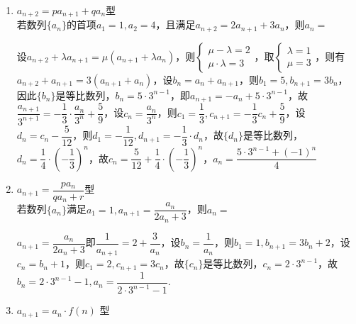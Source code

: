 \begin{enumerate}
\begin{enumerate}
        \begin{jieda}
            $a_{n+1} = 2a_n + 4 \cdot 3^{n+1}$即$\dfrac{a_{n+1}}{3^{n+1}} = \dfrac{2}{3} \cdot \dfrac{a_n}{3^n} + 4$，设$b_n = \dfrac{a_n}{3^n}$，则$b_1 = \dfrac{1}{3}, b_{n+1} = \dfrac{2}{3}b_n + 4$，设$c_n = b_n - 12$，则$c_1 = -\dfrac{35}{3}, c_{n+1} = \dfrac{2}{3}c_n$，因此$\{c_n\}$是等比数列，$c_n = -\dfrac{35}{2} \cdot \left ( \dfrac{2}{3} \right )^n$，故$b_n = 12 - \dfrac{35}{2}  \cdot \left ( \dfrac{2}{3} \right )^n$，$a_n = 4 \cdot 3^{n+1} - 35 \cdot 2^{n-1}$
        \end{jieda}
        \item $a_{n+2} = pa_{n+1} + qa_n$型 \\
        若数列$\{a_n\}$的首项$a_1 = 1, a_2 = 4$，且满足$a_{n+2} = 2a_{n+1}+3a_n$，则$a_n = $
        \begin{jieda}
            设$a_{n+2} + \lambda a_{n+1} = \mu(a_{n+1} + \lambda a_n)$，则$\left \{ \begin{array}{l}
                \mu - \lambda = 2 \\
                \mu \cdot \lambda = 3
            \end{array} \right.$，取$\left \{ \begin{array}{l}
                \lambda = 1 \\
                \mu = 3
            \end{array} \right.$，则有$a_{n+2} + a_{n+1} = 3(a_{n+1} + a_n)$，设$b_n = a_n + a_{n+1}$，则$b_1 = 5, b_{n+1} = 3b_n$，因此$\{b_n\}$是等比数列，$b_n = 5 \cdot 3^{n-1}$，即$a_{n+1} = -a_n + 5 \cdot 3^{n-1}$，故$\dfrac{a_{n+1}}{3^{n+1}} = -\dfrac{1}{3} \cdot \dfrac{a_n}{3^n} + \dfrac{5}{9}$，设$c_n = \dfrac{a_n}{3^n}$，则$c_1 = \dfrac{1}{3}, c_{n+1} = -\dfrac{1}{3} c_n + \dfrac{5}{9}$，设$d_n = c_n - \dfrac{5}{12}$，则$d_1 = -\dfrac{1}{12}, d_{n+1} = -\dfrac{1}{3}\cdot d_n$，故$\{d_n\}$是等比数列，$d_n = \dfrac{1}{4} \cdot \left (-\dfrac{1}{3} \right)^n$，故$c_n = \dfrac{5}{12} + \dfrac{1}{4} \cdot \left (-\dfrac{1}{3} \right)^n$，$a_n = \dfrac{5 \cdot 3^{n-1} + (-1)^n}{4}$
        \end{jieda}
        \item $a_{n+1} = \dfrac{pa_n}{qa_n+r}$型 \\
        若数列$\{a_n\}$满足$a_1 = 1, a_{n+1} = \dfrac{a_n}{2a_n + 3}$，则$a_n = $
        \begin{jieda}
            $a_{n+1} = \dfrac{a_n}{2a_n + 3}$即$\dfrac{1}{a_{n+1}} = 2 + \dfrac{3}{a_n}$，设$b_n = \dfrac{1}{a_n}$，则$b_1 = 1, b_{n+1} = 3b_n + 2$，设$c_n = b_n + 1$，则$c_1 = 2, c_{n+1} = 3c_n$，故$\{c_n\}$是等比数列，$c_n = 2 \cdot 3^{n-1}$，故$b_n = 2\cdot 3^{n-1}-1, a_n = \dfrac{1}{2\cdot 3^{n-1}-1}$.
        \end{jieda}
        \item $a_{n+1} = a_n \cdot f(n)$ 型
        

\end{enumerate}
\end{enumerate}
